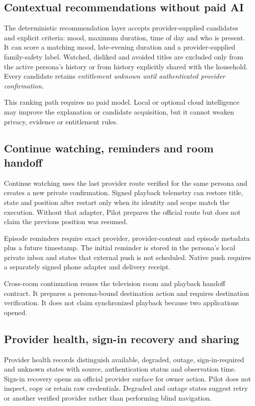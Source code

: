 \subsection{Contextual recommendations without paid AI}

The deterministic recommendation layer accepts provider-supplied candidates and explicit
criteria: mood, maximum duration, time of day and who is present.  It can score a matching
mood, late-evening duration and a provider-supplied family-safety label.  Watched,
disliked and avoided titles are excluded only from the active persona's history or from
history explicitly shared with the household.  Every candidate retains
\emph{entitlement unknown until authenticated provider confirmation}.

This ranking path requires no paid model.  Local or optional cloud intelligence may improve
the explanation or candidate acquisition, but it cannot weaken privacy, evidence or
entitlement rules.

\subsection{Continue watching, reminders and room handoff}

Continue watching uses the last provider route verified for the same persona and creates a
new private confirmation.  Signed playback telemetry can restore title, state and position
after restart only when its identity and scope match the execution.  Without that adapter,
Pilot prepares the official route but does not claim the previous position was resumed.

Episode reminders require exact provider, provider-content and episode metadata plus a
future timestamp.  The initial reminder is stored in the persona's local private inbox and
states that external push is not scheduled.  Native push requires a separately signed phone
adapter and delivery receipt.

Cross-room continuation reuses the television room and playback handoff contract.  It
prepares a persona-bound destination action and requires destination verification.  It
does not claim synchronized playback because two applications opened.

\subsection{Provider health, sign-in recovery and sharing}

Provider health records distinguish available, degraded, outage, sign-in-required and
unknown states with source, authentication status and observation time.  Sign-in recovery
opens an official provider surface for owner action.  Pilot does not inspect, copy or retain
raw credentials.  Degraded and outage states suggest retry or another verified provider
rather than performing blind navigation.

